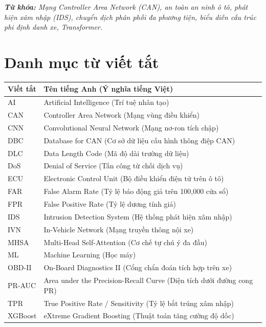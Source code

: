 \documentclass[12pt, a4paper, reqno, oneside]{book}
\begin{document}
\vspace{1em}
\noindent \textit{\textbf{Từ khóa:} Mạng Controller Area Network (CAN), an toàn an ninh ô tô, phát hiện xâm nhập (IDS), chuyển dịch phân phối đa phương tiện, biểu diễn cấu trúc phi định danh xe, Transformer.}

\newpage
\tableofcontents

\newpage
\listoffigures

\newpage
\listoftables

\newpage
\chapter*{Danh mục từ viết tắt}
\vspace{20pt}

\begin{table}[H]
\centering
\begin{tabular}{|m{2.5cm}|m{11cm}|}
\hline
\textbf{Viết tắt} & \textbf{Tên tiếng Anh (Ý nghĩa tiếng Việt)} \\ \hline
AI & Artificial Intelligence (Trí tuệ nhân tạo) \\ \hline
CAN & Controller Area Network (Mạng vùng điều khiển) \\ \hline
CNN & Convolutional Neural Network (Mạng nơ-ron tích chập) \\ \hline
DBC & Database for CAN (Cơ sở dữ liệu cấu hình thông điệp CAN) \\ \hline
DLC & Data Length Code (Mã độ dài trường dữ liệu) \\ \hline
DoS & Denial of Service (Tấn công từ chối dịch vụ) \\ \hline
ECU & Electronic Control Unit (Bộ điều khiển điện tử trên ô tô) \\ \hline
FAR & False Alarm Rate (Tỷ lệ báo động giả trên 100,000 cửa sổ) \\ \hline
FPR & False Positive Rate (Tỷ lệ dương tính giả) \\ \hline
IDS & Intrusion Detection System (Hệ thống phát hiện xâm nhập) \\ \hline
IVN & In-Vehicle Network (Mạng truyền thông nội xe) \\ \hline
MHSA & Multi-Head Self-Attention (Cơ chế tự chú ý đa đầu) \\ \hline
ML & Machine Learning (Học máy) \\ \hline
OBD-II & On-Board Diagnostics II (Cổng chẩn đoán tích hợp trên xe) \\ \hline
PR-AUC & Area under the Precision-Recall Curve (Diện tích dưới đường cong PR) \\ \hline
TPR & True Positive Rate / Sensitivity (Tỷ lệ bắt trúng xâm nhập) \\ \hline
XGBoost & eXtreme Gradient Boosting (Thuật toán tăng cường độ dốc) \\ \hline
\end{tabular}
\end{table}
\end{document}
